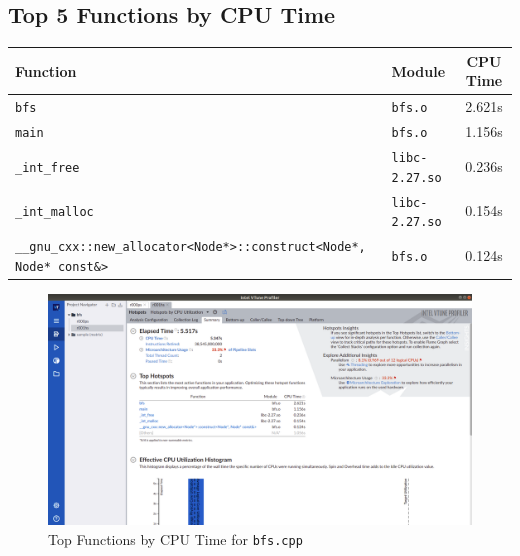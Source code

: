 \documentclass[11pt, swedish, openany]{book}
\begin{document}
\subsection*{Top 5 Functions by CPU Time}
\begin{table}[H]
    \begin{tabular}{||l|l||c||}
        \hline
        Function                                                                      & Module                & CPU Time \\
        \hline
        \texttt{bfs}                                                                  & \texttt{bfs.o}        & 2.621s   \\
        \texttt{main}                                                                 & \texttt{bfs.o}        & 1.156s   \\
        \texttt{\_int\_free}                                                          & \texttt{libc-2.27.so} & 0.236s   \\
        \texttt{\_int\_malloc}                                                        & \texttt{libc-2.27.so} & 0.154s   \\
        \texttt{\_\_gnu\_cxx::new\_allocator<Node*>::construct<Node*, Node* const\&>} & \texttt{bfs.o}        & 0.124s   \\
        \hline
    \end{tabular}
\end{table}

\begin{figure}[H]
    \centering
    \includegraphics[scale=0.25]{vtune/bfs/hs.png}
    \caption{Top Functions by CPU Time for \texttt{bfs.cpp}}
\end{figure}

\newpage
\end{document}
